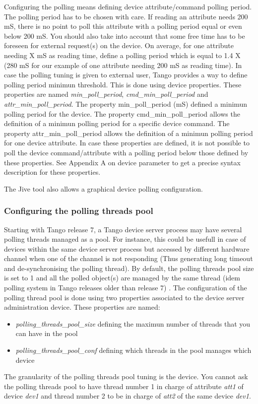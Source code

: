 Configuring the polling means defining device attribute/command polling
period. The polling period has to be chosen with care. If reading
an attribute needs 200 mS, there is no point to poll this attribute
with a polling period equal or even below 200 mS. You should also
take into account that some \textquotedbl{}free\textquotedbl{} time
has to be foreseen for external request(s) on the device. On average,
for one attribute needing X mS as reading time, define a polling period
which is equal to 1.4 X (280 mS for our example of one attribute needing
200 mS as reading time). In case the polling tuning is given to external
user, Tango provides a way to define polling period minimun threshold.
This is done using device properties. These properties are named \emph{min\_poll\_period},
\emph{cmd\_min\_poll\_period} and \emph{attr\_min\_poll\_period}.
The property min\_poll\_period (mS) defined
a minimun polling period for the device. The property cmd\_min\_poll\_period
allows the definition of a minimun polling period for a specific device
command. The property attr\_min\_poll\_period
allows the definition of a minimun polling period for one device attribute.
In case these properties are defined, it is not possible to poll the
device command/attribute with a polling period below those defined
by these properties. See Appendix A on device parameter to get a precise
syntax description for these properties.

The Jive\cite{Jive doc} tool also allows a graphical device polling
configuration.


\subsubsection{Configuring the polling threads pool}

Starting with Tango release 7, a Tango device server process may have
several polling threads managed as a pool. For instance, this could
be usefull in case of devices within the same device server process
but accessed by different hardware channel when one of the channel
is not responding (Thus generating long timeout and de-synchronising
the polling thread). By default, the polling threads pool size is
set to 1 and all the polled object(s) are managed by the same thread
(idem polling system in Tango releases older than release 7) . The
configuration of the polling thread pool is done using two properties
associated to the device server administration device. These properties
are named:
\begin{itemize}
\item \emph{polling\_threads\_pool\_size}
defining the maximun number of threads that you can have in the pool
\item \emph{polling\_threads\_pool\_conf}
defining which threads in the pool manages which device
\end{itemize}
The granularity of the polling threads pool tuning is the device.
You cannot ask the polling threads pool to have thread number 1 in
charge of attribute \emph{att1} of device \emph{dev1} and thread number
2 to be in charge of \emph{att2} of the same device \emph{dev1}.

